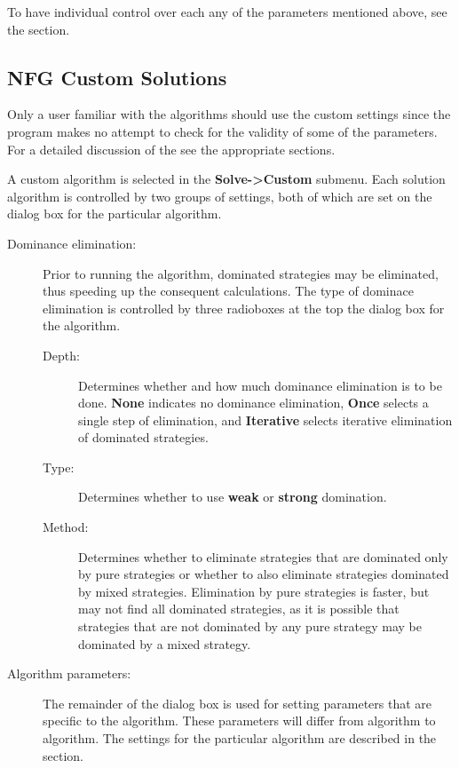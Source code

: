 To have individual control over each any of the parameters mentioned above, see
the  section.

\subsection{NFG Custom Solutions}\label{NFGCustomSolutions}
Only a user familiar with the algorithms should use the custom
settings since the program makes no attempt to check for the validity
of some of the parameters.  For a detailed discussion of the 
 see the appropriate sections.

A custom algorithm is selected in the {\bf Solve->Custom} submenu.
Each solution algorithm is controlled by two groups of settings, both
of which are set on the dialog box for the particular algorithm.
\begin{description}
\item[Dominance elimination:] Prior to running the algorithm,
dominated strategies may be eliminated, thus speeding up the
consequent calculations.  The type of dominace elimination is
controlled by three radioboxes at the top the dialog box for the
algorithm.
\begin{description}
\item[Depth:] Determines whether and how much dominance
elimination is to be done.  {\bf None} indicates no dominance
elimination, {\bf Once} selects a single step of elimination, and {\bf 
Iterative} selects iterative elimination of dominated strategies.
\item[Type:] Determines whether to use {\bf weak} or {\bf strong}
domination.
\item[Method:] Determines whether to eliminate strategies that are
dominated only by pure strategies or whether to also eliminate
strategies dominated by mixed strategies.  Elimination by pure
strategies is faster, but may not find all dominated strategies, as it
is possible that strategies that are not dominated by any pure
strategy may be dominated by a mixed strategy.
\end{description}
\item[Algorithm parameters:] The remainder of the dialog box is used
for setting parameters that are specific to the algorithm.  These
parameters will differ from algorithm to algorithm.  The settings for
the particular algorithm are described in the 
 section.
\end{description}

